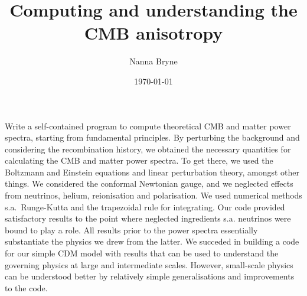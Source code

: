 





\title{Computing and understanding the CMB anisotropy}

\author{Nanna Bryne
}
\date{\today}  


    {Write a self-contained program to compute theoretical CMB and matter power spectra, starting from fundamental principles.} %
    {By perturbing the background and considering the recombination history, we obtained the necessary quantities for calculating the CMB and matter power spectra. To get there, we used the Boltzmann and Einstein equations and linear perturbation theory, amongst other things. We considered the conformal Newtonian gauge, and we neglected effects from neutrinos, helium, reionisation and polarisation. We used numerical methods s.a.~Runge-Kutta and the trapezoidal rule for integrating.}  %
    {Our code provided satisfactory results to the point where neglected ingredients s.a. neutrinos were bound to play a role. All results prior to the power spectra essentially substantiate the physics we drew from the latter.} %
    {We succeded in building a code for our simple \textLambda CDM model with results that can be used to understand the governing physics at large and intermediate scales. However, small-scale physics can be understood better by relatively simple generalisations and improvements to the code.} %


\maketitle



